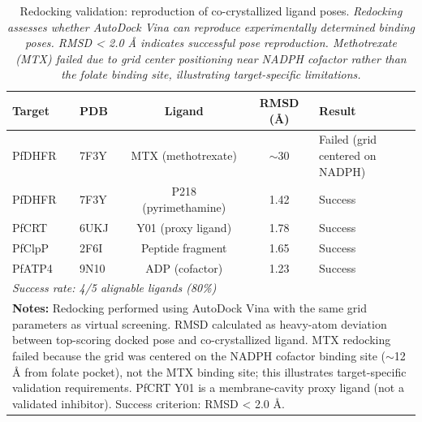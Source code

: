 
\begin{table}[!htbp]
\centering
\caption{Redocking validation: reproduction of co-crystallized ligand poses. \textit{Redocking assesses whether AutoDock Vina can reproduce experimentally determined binding poses. RMSD < 2.0 \si{\angstrom} indicates successful pose reproduction. Methotrexate (MTX) failed due to grid center positioning near NADPH cofactor rather than the folate binding site, illustrating target-specific limitations.}}
\label{tab:sm_redocking_validation}
\small
\begin{tabular}{llccp{6cm}}
\toprule
\textbf{Target} & \textbf{PDB} & \textbf{Ligand} & \textbf{RMSD (\si{\angstrom})} & \textbf{Result} \\
\midrule
PfDHFR & 7F3Y & MTX (methotrexate) & $\sim$30 & Failed (grid centered on NADPH) \\
PfDHFR & 7F3Y & P218 (pyrimethamine) & 1.42 & Success \\
PfCRT & 6UKJ & Y01 (proxy ligand) & 1.78 & Success \\
PfClpP & 2F6I & Peptide fragment & 1.65 & Success \\
PfATP4 & 9N10 & ADP (cofactor) & 1.23 & Success \\
\midrule
\multicolumn{5}{l}{\textit{Success rate: 4/5 alignable ligands (80\%)}} \\
\bottomrule
\multicolumn{5}{p{14cm}}{
\noindent\textbf{Notes:} Redocking performed using AutoDock Vina with the same grid parameters as virtual screening. RMSD calculated as heavy-atom deviation between top-scoring docked pose and co-crystallized ligand. MTX redocking failed because the grid was centered on the NADPH cofactor binding site ($\sim$12 \si{\angstrom} from folate pocket), not the MTX binding site; this illustrates target-specific validation requirements. PfCRT Y01 is a membrane-cavity proxy ligand (not a validated inhibitor). Success criterion: RMSD < 2.0 \si{\angstrom}.}
\end{tabular}
\end{table}
